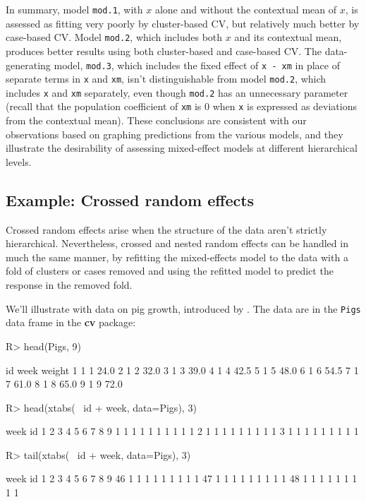 \documentclass[
]{jss}
\begin{document}
In summary, model \texttt{mod.1}, with \(x\) alone and without the
contextual mean of \(x\), is assessed as fitting very poorly by
cluster-based CV, but relatively much better by case-based CV. Model
\texttt{mod.2}, which includes both \(x\) and its contextual mean,
produces better results using both cluster-based and case-based CV. The
data-generating model, \texttt{mod.3}, which includes the fixed effect
of \texttt{x\ -\ xm} in place of separate terms in \texttt{x} and
\texttt{xm}, isn't distinguishable from model \texttt{mod.2}, which
includes \texttt{x} and \texttt{xm} separately, even though
\texttt{mod.2} has an unnecessary parameter (recall that the population
coefficient of \texttt{xm} is 0 when \texttt{x} is expressed as
deviations from the contextual mean). These conclusions are consistent
with our observations based on graphing predictions from the various
models, and they illustrate the desirability of assessing mixed-effect
models at different hierarchical levels.

\hypertarget{example-crossed-random-effects}{%
\subsection{Example: Crossed random
effects}\label{example-crossed-random-effects}}

Crossed random effects arise when the structure of the data aren't
strictly hierarchical. Nevertheless, crossed and nested random effects
can be handled in much the same manner, by refitting the mixed-effects
model to the data with a fold of clusters or cases removed and using the
refitted model to predict the response in the removed fold.

We'll illustrate with data on pig growth, introduced by \citet[Table
3.1]{DiggleLiangZeger:1994}. The data are in the \texttt{Pigs} data
frame in the \textbf{cv} package:

\begin{CodeChunk}
\begin{CodeInput}
R> head(Pigs, 9)
\end{CodeInput}
\begin{CodeOutput}
  id week weight
1  1    1   24.0
2  1    2   32.0
3  1    3   39.0
4  1    4   42.5
5  1    5   48.0
6  1    6   54.5
7  1    7   61.0
8  1    8   65.0
9  1    9   72.0
\end{CodeOutput}
\begin{CodeInput}
R> head(xtabs(~ id + week, data=Pigs), 3)
\end{CodeInput}
\begin{CodeOutput}
   week
id  1 2 3 4 5 6 7 8 9
  1 1 1 1 1 1 1 1 1 1
  2 1 1 1 1 1 1 1 1 1
  3 1 1 1 1 1 1 1 1 1
\end{CodeOutput}
\begin{CodeInput}
R> tail(xtabs(~ id + week, data=Pigs), 3)
\end{CodeInput}
\begin{CodeOutput}
    week
id   1 2 3 4 5 6 7 8 9
  46 1 1 1 1 1 1 1 1 1
  47 1 1 1 1 1 1 1 1 1
  48 1 1 1 1 1 1 1 1 1
\end{CodeOutput}
\end{CodeChunk}
\end{document}
